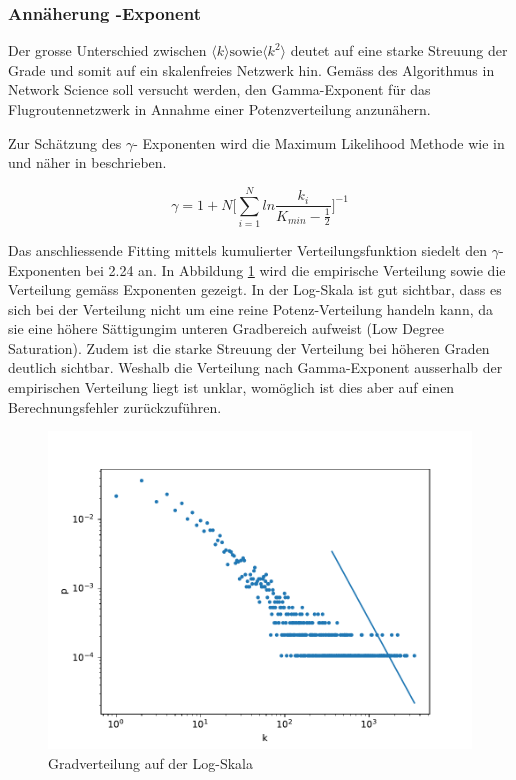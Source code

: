 \subsubsection{Annäherung \gamma-Exponent}
Der grosse Unterschied zwischen $\langle k \rangle \text{sowie} \langle k^{2} \rangle$ deutet auf eine starke Streuung der
Grade und somit auf ein skalenfreies Netzwerk hin.
Gemäss des Algorithmus in Network Science\cite{barabasi-network-science} soll versucht werden, den Gamma-Exponent für das Flugroutennetzwerk in Annahme einer Potenzverteilung anzunähern.

Zur Schätzung des $ \gamma$- Exponenten wird die Maximum Likelihood Methode wie in \cite{barabasi-network-science} und näher
in \cite{clauset-power-law-distribution} beschrieben.

$$ \gamma = 1 + N\Bigg[\sum_{i=1}^{N}ln \frac{k_{i}}{K_{min} - \frac{1}{2}}\Bigg]^{-1} $$

Das anschliessende Fitting mittels kumulierter Verteilungsfunktion siedelt den $\gamma$-Exponenten bei 2.24 an.
In Abbildung \ref{fig:degreeDist} wird die empirische Verteilung sowie die Verteilung gemäss Exponenten gezeigt.
In der Log-Skala ist gut sichtbar, dass es sich bei der Verteilung nicht um eine reine Potenz-Verteilung handeln kann,
da sie eine höhere \guillemotleft Sättigung\guillemotright im unteren Gradbereich aufweist (\guillemotleft Low Degree Saturation\guillemotright).
Zudem ist die starke Streuung der Verteilung bei höheren Graden deutlich sichtbar.
Weshalb die Verteilung nach Gamma-Exponent ausserhalb der empirischen Verteilung liegt ist unklar, womöglich ist dies aber auf einen
Berechnungsfehler zurückzuführen.

\begin{figure}
    \centering
    \includegraphics[width=0.75\linewidth]{images/degree-distribution.pdf}
    \caption{Gradverteilung auf der Log-Skala}
    \label{fig:degreeDist}
\end{figure}


